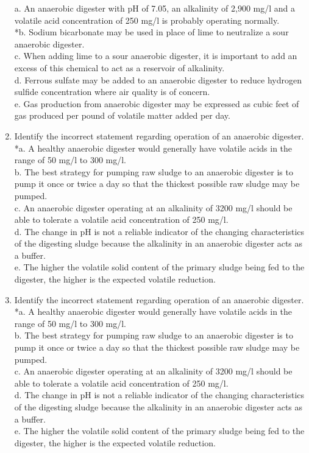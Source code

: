 \documentclass{article}
\begin{document}
\begin{enumerate}
a. An anaerobic digester with pH of 7.05, an alkalinity of 2,900 mg/l and a volatile acid concentration of 250 mg/l is probably operating normally. \\
*b. Sodium bicarbonate may be used in place of lime to neutralize a sour anaerobic digester. \\
c. When adding lime to a sour anaerobic digester, it is important to add an excess of this chemical to act as a reservoir of alkalinity. \\
d. Ferrous sulfate may be added to an anaerobic digester to reduce hydrogen sulfide concentration where air quality is of concern. \\
e. Gas production from anaerobic digester may be expressed as cubic feet of gas produced per pound of volatile matter added per day. \\

\item  Identify the incorrect statement regarding operation of an anaerobic digester. \\

*a. A healthy anaerobic digester would generally have volatile acids in the range of 50 mg/l to 300 mg/l. \\
b. The best strategy for pumping raw sludge to an anaerobic digester is to pump it once or twice a day so that the thickest possible raw sludge may be pumped. \\
c. An anaerobic digester operating at an alkalinity of 3200 mg/l should be able to tolerate a volatile acid concentration of 250 mg/l. \\
d. The change in pH is not a reliable indicator of the changing characteristics of the digesting sludge because the alkalinity in an anaerobic digester acts as a buffer. \\
e. The higher the volatile solid content of the primary sludge being fed to the digester, the higher is the expected volatile reduction. \\

\item  Identify the incorrect statement regarding operation of an anaerobic digester. \\

*a. A healthy anaerobic digester would generally have volatile acids in the range of 50 mg/l to 300 mg/l. \\
b. The best strategy for pumping raw sludge to an anaerobic digester is to pump it once or twice a day so that the thickest possible raw sludge may be pumped. \\
c. An anaerobic digester operating at an alkalinity of 3200 mg/l should be able to tolerate a volatile acid concentration of 250 mg/l. \\
d. The change in pH is not a reliable indicator of the changing characteristics of the digesting sludge because the alkalinity in an anaerobic digester acts as a buffer. \\
e. The higher the volatile solid content of the primary sludge being fed to the digester, the higher is the expected volatile reduction. \\


\end{enumerate}
\end{document}
